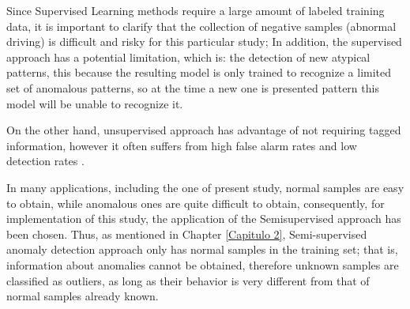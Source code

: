 \vspace{5mm} %

Since Supervised Learning methods require a large amount of labeled training data, it is important to clarify that the collection of negative samples (abnormal driving) is difficult and risky for this particular study; In addition, the supervised approach has a potential limitation, which is: the detection of new atypical patterns, this because the resulting model is only trained to recognize a limited set of anomalous patterns, so at the time a new one is presented pattern this model will be unable to recognize it.

\vspace{5mm} %

On the other hand, unsupervised approach has advantage of not requiring tagged information, however it often suffers from high false alarm rates and low detection rates \cite{Reference33}.

\vspace{5mm} %

In many applications, including the one of present study, normal samples are easy to obtain, while anomalous ones are quite difficult to obtain, consequently, for implementation of this study, the application of the Semisupervised approach has been chosen. Thus, as mentioned in Chapter \ref{Capitulo 2}, Semi-supervised anomaly detection approach only has normal samples in the training set; that is, information about anomalies cannot be obtained, therefore unknown samples are classified as outliers, as long as their behavior is very different from that of normal samples already known.

